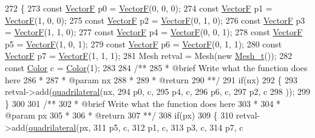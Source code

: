 \begin{DoxyCode}
272     \{
273         \textcolor{keyword}{const} \hyperlink{structVectorF}{VectorF} p0 = \hyperlink{structVectorF}{VectorF}(0, 0, 0);
274         \textcolor{keyword}{const} \hyperlink{structVectorF}{VectorF} p1 = \hyperlink{structVectorF}{VectorF}(1, 0, 0);
275         \textcolor{keyword}{const} \hyperlink{structVectorF}{VectorF} p2 = \hyperlink{structVectorF}{VectorF}(0, 1, 0);
276         \textcolor{keyword}{const} \hyperlink{structVectorF}{VectorF} p3 = \hyperlink{structVectorF}{VectorF}(1, 1, 0);
277         \textcolor{keyword}{const} \hyperlink{structVectorF}{VectorF} p4 = \hyperlink{structVectorF}{VectorF}(0, 0, 1);
278         \textcolor{keyword}{const} \hyperlink{structVectorF}{VectorF} p5 = \hyperlink{structVectorF}{VectorF}(1, 0, 1);
279         \textcolor{keyword}{const} \hyperlink{structVectorF}{VectorF} p6 = \hyperlink{structVectorF}{VectorF}(0, 1, 1);
280         \textcolor{keyword}{const} \hyperlink{structVectorF}{VectorF} p7 = \hyperlink{structVectorF}{VectorF}(1, 1, 1);
281         Mesh retval = Mesh(\textcolor{keyword}{new} \hyperlink{classMesh__t}{Mesh\_t}());
282         \textcolor{keyword}{const} \hyperlink{structColor}{Color} c = \hyperlink{structColor}{Color}(1);
283 \textcolor{comment}{}
284 \textcolor{comment}{        /**}
285 \textcolor{comment}{         * @brief Write what the function does here}
286 \textcolor{comment}{         *}
287 \textcolor{comment}{         * @param nx}
288 \textcolor{comment}{         *}
289 \textcolor{comment}{         * @return}
290 \textcolor{comment}{         **/}
291         \textcolor{keywordflow}{if}(nx)
292         \{
293             retval->add(\hyperlink{namespaceGenerate_afd427e6ee5edcf5cab7d521048466496}{quadrilateral}(nx,
294                         p0, c,
295                         p4, c,
296                         p6, c,
297                         p2, c
298                         ));
299         \}
300 \textcolor{comment}{}
301 \textcolor{comment}{        /**}
302 \textcolor{comment}{         * @brief Write what the function does here}
303 \textcolor{comment}{         *}
304 \textcolor{comment}{         * @param px}
305 \textcolor{comment}{         *}
306 \textcolor{comment}{         * @return}
307 \textcolor{comment}{         **/}
308         \textcolor{keywordflow}{if}(px)
309         \{
310             retval->add(\hyperlink{namespaceGenerate_afd427e6ee5edcf5cab7d521048466496}{quadrilateral}(px,
311                         p5, c,
312                         p1, c,
313                         p3, c,
314                         p7, c

\end{DoxyCode}
